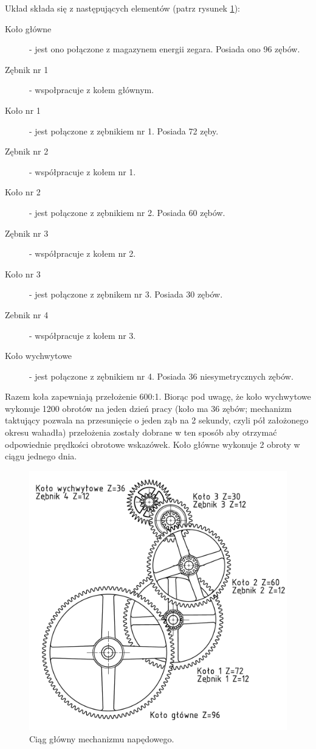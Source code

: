   				Układ składa się z następujących elementów (patrz rysunek \ref{fig:kacpermechanizmassmdwg1}):
  				\begin{description}
  					\item[Koło główne] - jest ono połączone z magazynem energii zegara. Posiada ono 96 zębów.
  					\item[Zębnik nr 1] - wspołpracuje z kołem głównym.
  					\item[Koło nr 1] - jest połączone z zębnikiem nr 1. Posiada 72 zęby.
  					\item[Zębnik nr 2] - współpracuje z kołem nr 1.
  					\item[Koło nr 2] - jest połączone z zębnikiem nr 2. Posiada 60 zębów.
  					\item[Zębnik nr 3] - współpracuje z kołem nr 2.
  					\item[Koło nr 3] - jest połączone z zębnikem nr 3. Posiada 30 zębów.
  					\item[Zebnik nr 4] - współpracuje z kołem nr 3.
  					\item[Koło wychwytowe] - jest połączone z zębnikiem nr 4. Posiada 36 niesymetrycznych zębów.
  				\end{description}
  				Razem koła zapewniają przełożenie 600:1.
  				Biorąc pod uwagę, że koło wychwytowe wykonuje 1200 obrotów na jeden dzień pracy (koło ma 36 zębów; mechanizm taktujący pozwala na przesunięcie o jeden ząb na 2 sekundy, czyli pół założonego okresu wahadła) przełożenia zostały dobrane w ten sposób aby otrzymać odpowiednie prędkości obrotowe wskazówek.
  				Koło główne wykonuje 2 obroty w ciągu jednego dnia.
  				\begin{figure}
  					\centering
  					\includegraphics[width=\linewidth]{Projekt/ciag_glowny}
  					\caption{Ciąg główny mechanizmu napędowego.}
  					\label{fig:kacpermechanizmassmdwg1}
  				\end{figure}
  				
